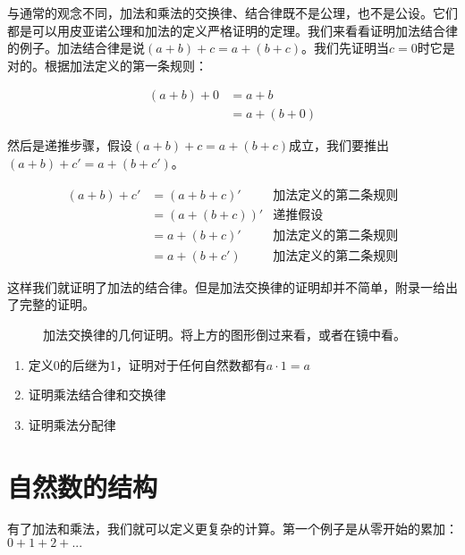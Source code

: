 \documentclass[UTF8]{article}
\begin{document}
与通常的观念不同，加法和乘法的交换律、结合律既不是公理，也不是公设。它们都是可以用皮亚诺公理和加法的定义严格证明的定理。我们来看看证明加法结合律的例子。加法结合律是说$(a + b) + c= a + (b + c)$。我们先证明当$c=0$时它是对的。根据加法定义的第一条规则：

\[
\begin{array}{rl}
(a + b) + 0 & = a + b \\
            & = a + (b + 0)
\end{array}
\]

然后是递推步骤，假设$(a + b) + c = a + (b + c)$成立，我们要推出$(a + b) + c' = a + (b + c')$。

\[
\begin{array}{rlr}
(a + b) + c' & = (a + b + c)' & \text{加法定义的第二条规则} \\
             & = (a + (b + c))' & \text{递推假设} \\
             & = a + (b + c)' & \text{加法定义的第二条规则} \\
             & = a + (b + c') & \text{加法定义的第二条规则}
\end{array}
\]

这样我们就证明了加法的结合律。但是加法交换律的证明却并不简单，附录一给出了完整的证明。

\begin{figure}[htbp]
\centering
{}
\caption{加法交换律的几何证明。将上方的图形倒过来看，或者在镜中看。}
\end{figure}

\begin{Exercise}
\begin{enumerate}
\item 定义0的后继为1，证明对于任何自然数都有$a \cdot 1 = a$
\item 证明乘法结合律和交换律
\item 证明乘法分配律
\end{enumerate}
\end{Exercise}

\section{自然数的结构}
有了加法和乘法，我们就可以定义更复杂的计算。第一个例子是从零开始的累加：$0 + 1 + 2 + ... $
\end{document}
